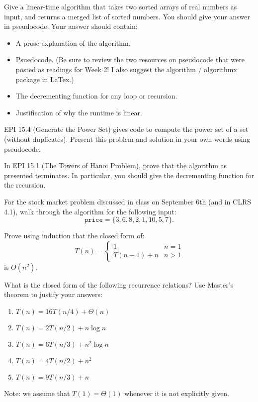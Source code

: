\documentclass{article}
\author{TODO-Your Group Number and Names Here}
\date{due: 20 September 2019}
\begin{document}
\nextprob
Give a linear-time algorithm that takes two sorted arrays of real numbers as
input, and returns a merged list of sorted numbers.  You should give your answer
in pseudocode.    Your answer should contain:
\begin{itemize}
    \item A prose explanation of the algorithm.
    \item Psuedocode. (Be sure to review the two resources on pseudocode that were
        posted as readings for Week 2!  I also suggest the algorithm /
        algorithmx package in LaTex.)
    \item The decrementing function for any loop or recursion.
    \item Justification of why the runtime is linear.
\end{itemize}

\nextprob
EPI 15.4 (Generate the Power Set) gives code to compute the power set of a set
(without duplicates).  Present this problem and solution in your own words using
pseudocode.

\nextprob
In EPI 15.1 (The Towers of Hanoi Problem), prove that the algorithm as presented
terminates.  In particular, you should give the decrementing function for the
recursion.

\nextprob
For the stock market problem discussed in class on September 6th (and in CLRS
4.1), walk through
the algorithm for the following input:
$$\mathtt{price} = \{ 3, 6, 8, 2, 1, 10, 5, 7 \}. $$

\nextprob
Prove using induction that the closed form of:
$$T(n) = \begin{cases}
            1        & n=1\\
            T(n-1)+n & n>1
         \end{cases}
$$
is $O(n^2)$.

\nextprob
What is the closed form of the following recurrence relations?  Use Master's
theorem to justify your answers:
\begin{enumerate}
    \item $T(n) = 16 T(n/4) + \Theta(n)$
    \item $T(n) = 2 T(n/2) + n \log{n}$
    \item $T(n) = 6 T(n/3) + n^2 \log{n}$
    \item $T(n) = 4 T(n/2) + n^2$
    \item $T(n) = 9 T(n/3) + n$
\end{enumerate}
Note: we assume that $T(1)=\Theta(1)$ whenever it is not explicitly given.
\end{document}
